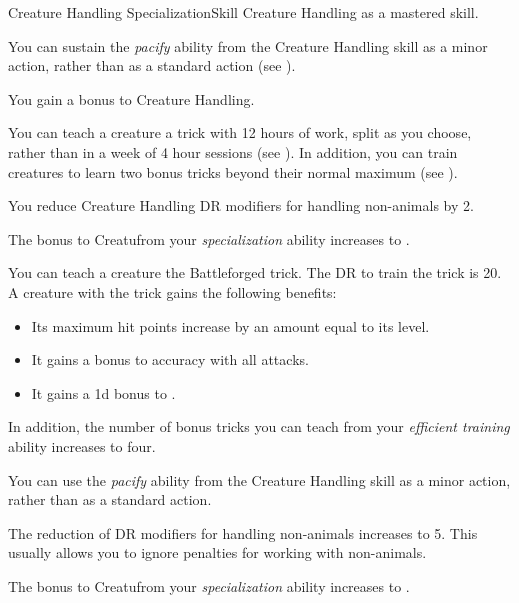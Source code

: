     \begin{feat}{Creature Handling Specialization}{Skill}
        \featpre Creature Handling as a mastered skill.

         You can sustain the \textit{pacify} ability from the Creature Handling skill as a minor action, rather than as a standard action (see ).

         You gain a  bonus to Creature Handling.

         You can teach a creature a trick with 12 hours of work, split as you choose, rather than in a week of 4 hour sessions (see ).
        In addition, you can train creatures to learn two bonus tricks beyond their normal maximum (see ).

         You reduce Creature Handling DR modifiers for handling non-animals by 2.

         The bonus to Creatufrom your \textit{specialization} ability increases to .

         You can teach a creature the Battleforged trick.
        The DR to train the trick is 20.
        A creature with the trick gains the following benefits:
        \begin{itemize}
            \item Its maximum hit points increase by an amount equal to its level.
            \item It gains a  bonus to accuracy with all attacks.
            \item It gains a \plus1d bonus to .
        \end{itemize}
        In addition, the number of bonus tricks you can teach from your \textit{efficient training} ability increases to four.

         You can use the \textit{pacify} ability from the Creature Handling skill as a minor action, rather than as a standard action.

         The reduction of DR modifiers for handling non-animals increases to 5.
        This usually allows you to ignore penalties for working with non-animals.

         The bonus to Creatufrom your \textit{specialization} ability increases to .


\end{feat}

